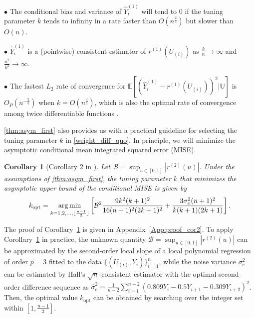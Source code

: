 \documentclass{uwstat572}
\newtheorem{cor}[theorem]{Corollary}
\theoremstyle{definition}
\DeclareMathOperator*{\argmin}{arg\,min}
\DeclarePairedDelimiter\floor{\lfloor}{\rfloor}
\renewcommand{\hat}{\widehat}
\theoremstyle{theorem}
\begin{document}
\noindent$\bullet$ The conditional bias and variance of $\hat{Y}_i^{(1)}$ will tend to 0 if the tuning parameter $k$ tends to infinity in a rate faster than $O\left(n^{\frac{2}{3}}\right)$ but slower than $O\left(n \right)$.
	
\noindent$\bullet$ $\hat{Y}_i^{(1)}$ is a (pointwise) consistent estimator of $r^{(1)}(U_{(i)})$ as $\frac{k}{n} \to \infty$ and $\frac{n^2}{k^3}\to \infty$.
	
\noindent$\bullet$ The fastest $L_2$ rate of convergence for $\mathbb{E}\left[\left(\hat{Y}_i^{(1)} - r^{(1)}(U_{(i)})\right)^2 \big| \mathbb{U}\right]$ is $O_P\left(n^{-\frac{2}{5}}\right)$ when $k=O\left(n^{\frac{4}{5}}\right)$, which is also the optimal rate of convergence among twice differentiable functions \citep{stone1982optimal}.

\autoref{thm:asym_first} also provides us with a practical guideline for selecting the tuning parameter $k$ in \eqref{weight_diff_quo}. In principle, we will minimize the asymptotic conditional mean integrated squared error (MISE).

\begin{cor}[Corollary 2 in \citealt{liu2020smoothed}]
\label{cor:k_sel}
Let $\mathcal{B} = \sup_{u\in [0,1]} \left|r^{(2)}(u)\right|$. Under the assumptions of \autoref{thm:asym_first}, the tuning parameter $k$ that minimizes the asymptotic upper bound of the conditional MISE is given by
$$k_{\text{opt}} = \argmin_{k=1,2,...,\floor{\frac{n-1}{2}}} \left[\mathcal{B}^2\frac{9k^2(k+1)^2}{16(n+1)^2(2k+1)^2} + \frac{3\sigma_e^2 (n+1)^2}{k(k+1)(2k+1)} \right].$$
\end{cor}

\noindent The proof of Corollary~\ref{cor:k_sel} is given in Appendix~\ref{App:proof_cor2}. To apply Corollary~\ref{cor:k_sel} in practice, the unknown quantity $\mathcal{B} = \sup_{u\in [0,1]} \left|r^{(2)}(u)\right|$ can be approximated by the second-order local slope of a local polynomial regression of order $p=3$ fitted to the data $\{(U_{(i)}, Y_i)\}_{i=1}^n$, while the noise variance $\sigma_e^2$ can be estimated by Hall's $\sqrt{n}$-consistent estimator with the optimal second-order difference sequence \citep{hall1990asymptotically} as $\hat{\sigma}_e^2 = \frac{1}{n-2} \sum_{i=1}^{n-2} \left(0.809Y_i - 0.5Y_{i+1} - 0.309Y_{i+2}\right)^2$. Then, the optimal value $k_{\text{opt}}$ can be obtained by searching over the integer set within $\left[1, \frac{n-1}{2}\right]$.
\end{document}

